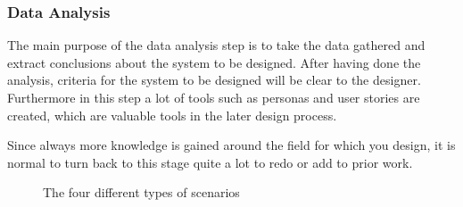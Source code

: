 \subsubsection{Data Analysis}
\label{sec:1_data_analysis}
The main purpose of the data analysis step is to take the data gathered and extract conclusions about the system to be designed. After having done the analysis, criteria for the system to be designed will be clear to the designer. Furthermore in this step a lot of tools such as personas and user stories are created, which are valuable tools in the later design process.

Since always more knowledge is gained around the field for which you design, it is normal to turn back to this stage quite a lot to redo or add to prior work.

\begin{method} \label{meth:affinity_diagram} 
  
\end{method}

\begin{method} \label{meth:rich_picture} 
  
\end{method}

\begin{tool}[Persona] \label{tool:persona} 
  
\end{tool}

\begin{tool} \label{tool:user_stories} 
  
\end{tool}

\begin{figure}
  \centering
  \caption{The four different types of scenarios \cite[p. 67]{benyon_14}}
  \label{fig:scenarios}
\end{figure}

\begin{definition} \label{meth:flow_model} 
  
\end{definition}

\begin{definition} \label{meth:sequence_model} 
  
\end{definition}
